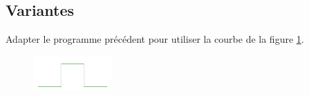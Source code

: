 \documentclass[a4paper,11pt]{article}
\begin{document}
\begin{Form}
\subsection{Variantes}
\begin{activite}
Adapter le programme précédent pour utiliser la courbe de la figure \ref{kochcarre}.
\end{activite}
\begin{figure}[!h]
\centering
\includegraphics[width=3cm]{ressources/vonkochcarre.png}
\label{kochcarre}
\end{figure}
\end{Form}
\end{document}
